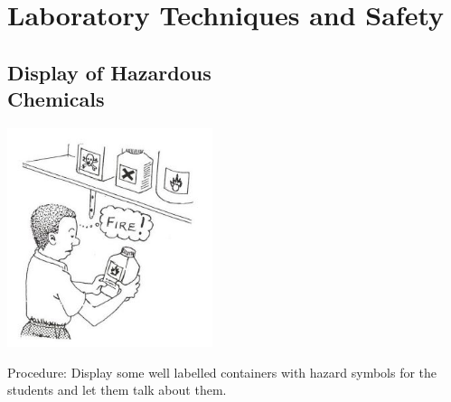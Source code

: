\section{Laboratory Techniques and Safety}

\begin{multicols}{2}




\subsection[Display of Hazardous Chemicals]{Display of Hazardous \hfill \\ Chemicals}

\begin{center}
\includegraphics[width=0.45\textwidth]{./img/source/display-chemicals.jpg}
\end{center}

\begin{description*}
\item[Procedure:]{Display some well labelled containers with
hazard symbols for the students and let them
talk about them.}
\end{description*}


\end{multicols}
